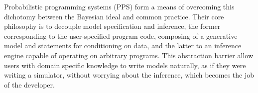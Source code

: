 
Probabilistic programming systems (PPS) \cite{carpenter2015stan,wood2014new} form a means of overcoming this dichotomy between the Bayesian ideal and common practice.  Their core philosophy is to decouple model specification and inference, the former corresponding to the user-specified program code, composing of a generative model and statements for conditioning on data, and the latter to an inference engine capable of operating on arbitrary programs.  This abstraction barrier allow users with domain specific knowledge to write models naturally, as if they were writing a simulator, without worrying about the inference, which becomes the job of the developer. %

